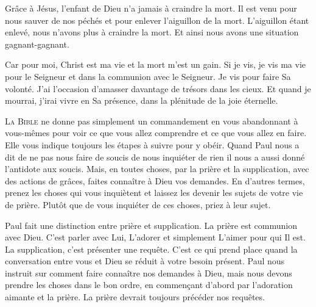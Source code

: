 Grâce à Jésus, l'enfant de Dieu n'a jamais à craindre la mort.
 Il est venu pour nous sauver de nos péchés et pour enlever l'aiguillon
 de la mort. L'aiguillon étant enlevé, nous n'avons plus à craindre la mort.
 Et ainsi nous avons une situation gagnant-gagnant.

\og Car pour moi, Christ est ma vie et la mort m'est un gain. \fg{}
 Si je vis, je vis ma vie pour le Seigneur et dans la communion
 avec le Seigneur. Je vis pour faire Sa volonté.
 J'ai l'occasion d'amasser davantage de trésors dans les cieux.
 Et quand je mourrai, j'irai vivre en Sa présence,
 dans la plénitude de la joie éternelle.

\dvrule







\lettrine{L}{a Bible} ne donne pas simplement un commandement
 en vous abandonnant à vous-mêmes pour voir ce que vous allez comprendre
 et ce que vous allez en faire. Elle vous indique toujours les étapes
 à suivre pour y obéir. Quand Paul nous a dit de ne pas nous faire de soucis
 \ocadr de nous \og inquiéter de rien \fg{} \fcadr{}
 il nous a aussi donné l'antidote aux soucis.
 \og Mais, en toutes choses, par la prière et la supplication,
 avec des actions de grâces, faites connaître à Dieu vos demandes. \fg{}
 En d'autres termes, prenez les choses qui vous inquiètent
 et laissez les devenir les sujets de votre vie de prière.
 Plutôt que de vous inquiéter 
 de ces choses, priez à leur sujet.


Paul fait une distinction entre prière et supplication.
 La prière est communion avec Dieu. C'est parler avec Lui, L'adorer
 et simplement L'aimer pour qui Il est. La supplication, 
 c'est présenter une requête.
 C'est ce qui prend place quand la conversation entre vous et Dieu se réduit
 à votre besoin présent. Paul nous instruit sur comment 
 faire connaître nos demandes à Dieu, mais nous devons prendre les choses
 dans le bon ordre, en commençant d'abord par l'adoration aimante et la prière.
 La prière devrait toujours précéder nos requêtes.

